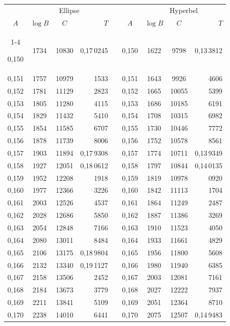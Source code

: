 \begin{tabular}{|c|c|c|r|@{}p{9pt}@{}|c|c|c|r|}
\hline
\rule{0pt}{8.5pt} & \multicolumn{3}{c|}{Ellipse} & & & \multicolumn{3}{c|}{Hyperbel} \\
\(A\) & \(\log B\) & \(C\) & \(T\) & & \(A\) & \(\log B\) & \(C\) & \(T\) \\
\cline{1-4}\cline{6-9}
\rule{0pt}{8.5pt}0,150 & 1734 & 10830 & 0,17\,0245 &  & 0,150 & 1622 & 9798 & 0,13\,3812 \\
0,151 & 1757 & 10979 & 1533 &  & 0,151 & 1643 & 9926 & 4606 \\
0,152 & 1781 & 11129 & 2823 &  & 0,152 & 1665 & 10055 & 5399 \\
0,153 & 1805 & 11280 & 4115 &  & 0,153 & 1686 & 10185 & 6191 \\
0,154 & 1829 & 11432 & 5410 &  & 0,154 & 1708 & 10315 & 6982 \\
0,155 & 1854 & 11585 & 6707 &  & 0,155 & 1730 & 10446 & 7772 \\[3pt]
0,156 & 1878 & 11739 & 8006 &  & 0,156 & 1752 & 10578 & 8561 \\
0,157 & 1903 & 11894 & 0,17\,9308 &  & 0,157 & 1774 & 10711 & 0,13\,9349 \\
0,158 & 1927 & 12051 & 0,18\,0612 &  & 0,158 & 1797 & 10844 & 0,14\,0135 \\
0,159 & 1952 & 12208 & 1918 &  & 0,159 & 1819 & 10978 & 0920 \\
0,160 & 1977 & 12366 & 3226 &  & 0,160 & 1842 & 11113 & 1704 \\[3pt]
0,161 & 2003 & 12526 & 4537 &  & 0,161 & 1864 & 11249 & 2487 \\
0,162 & 2028 & 12686 & 5850 &  & 0,162 & 1887 & 11386 & 3269 \\
0,163 & 2054 & 12848 & 7166 &  & 0,163 & 1910 & 11523 & 4050 \\
0,164 & 2080 & 13011 & 8484 &  & 0,164 & 1933 & 11661 & 4829 \\
0,165 & 2106 & 13175 & 0,18\,9804 &  & 0,165 & 1956 & 11800 & 5608 \\[3pt]
0,166 & 2132 & 13340 & 0,19\,1127 &  & 0,166 & 1980 & 11940 & 6385 \\
0,167 & 2158 & 13506 & 2452 &  & 0,167 & 2003 & 12081 & 7161 \\
0,168 & 2184 & 13673 & 3779 &  & 0,168 & 2027 & 12222 & 7937 \\
0,169 & 2211 & 13841 & 5109 &  & 0,169 & 2051 & 12364 & 8710 \\
0,170 & 2238 & 14010 & 6441 &  & 0,170 & 2075 & 12507 & 0,14\,9483 \\[3pt]

\end{tabular}
